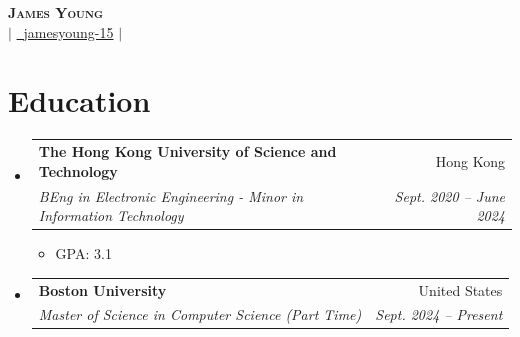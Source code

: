 \documentclass[letterpaper,12pt]{article}
\makeatletter
\newcommand{\resumeItem}[1]{
  \item\small{
    {#1 \vspace{-2pt}}
  }
}
\newcommand{\resumeSubheading}[4]{
  \vspace{-2pt}\item
    \begin{tabular*}{0.97\textwidth}[t]{l@{\extracolsep{\fill}}r}
      \textbf{#1} & #2 \\
      \textit{\small#3} & \textit{\small #4} \\
    \end{tabular*}\vspace{-7pt}
}
\newcommand{\resumeSubHeadingListStart}{\begin{itemize}[leftmargin=0.05in, label={}]}
\newcommand{\resumeSubHeadingListEnd}{\end{itemize}}
\newcommand{\resumeItemListStart}{\begin{itemize}}
\newcommand{\resumeItemListEnd}{\end{itemize}\vspace{-5pt}}
\makeatother
\begin{document}
\begin{center}
    \textbf{\Huge \scshape James Young} \\ \vspace{2pt}
    \small 
    \href{mailto:jyyoungaa@connect.ust.hk}{} $|$ 
    \href{https://github.com/jamesyoung-15} {\faGithub\ {jamesyoung-15}} $|$
    \href{https://linkedin.com/in/jamesyyoung}{}
\end{center}


\section{Education}
  \resumeSubHeadingListStart
    \resumeSubheading
      {The Hong Kong University of Science and Technology}{Hong Kong}
      {BEng in Electronic Engineering - Minor in Information Technology}{Sept. 2020 -- June 2024}
      \resumeItemListStart
       \resumeItem{GPA: 3.1}
       \resumeItemListEnd
       \vspace{-16pt}
  \resumeSubHeadingListEnd
  \resumeSubHeadingListStart
    \resumeSubheading
      {Boston University}{United States}
      {Master of Science in Computer Science (Part Time)}{Sept. 2024 -- Present}
  \resumeSubHeadingListEnd


\end{document}
